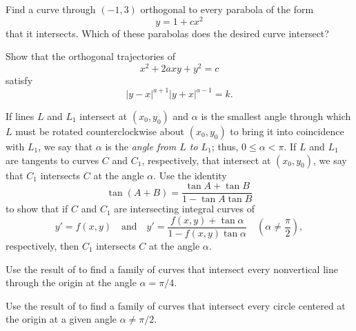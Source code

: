 \begin{exerciselist}
\item\label{exer:4.5.30}Find a curve through $(-1,3)$ orthogonal to every parabola of the form
\[
y=1+cx^2
\]
that it intersects. Which of these parabolas does the desired curve
intersect?

\item\label{exer:4.5.31}Show that the orthogonal trajectories of
\[
x^2+2axy+y^2=c
\]
satisfy
\[
|y-x|^{a+1}|y+x|^{a-1}=k.
\]

\item\label{exer:4.5.32}If lines $L$ and $L_1$ intersect at $(x_0,y_0)$ and $\alpha$ is the
smallest angle through which $L$ must be rotated counterclockwise
about $(x_0,y_0)$ to bring it into coincidence with $L_1$, we say that
$\alpha$ is the \emph{\color{blue}angle from $L$ to $L_1$};   thus,
$0\le\alpha<\pi$. If $L$ and $L_1$ are tangents to curves $C$ and
$C_1$, respectively, that intersect at $(x_0,y_0)$, we say that $C_1$
intersects $C$ at the angle $\alpha$. Use the identity
\[
\tan(A+B)=\frac{\tan A+\tan B}{1-\tan A\tan B}
\]
to show that if $C$ and $C_1$ are intersecting integral curves of
\[
y'=f(x,y)  \quad\text{and}\quad y'=\frac{f(x,y)+\tan\alpha}{1-f(x,y)\tan\alpha} \quad\left( \alpha \ne \frac{\pi}{2}\right),
\]
respectively, then $C_1$ intersects $C$ at the angle $\alpha$.

\item\label{exer:4.5.33}Use the result of  to find a family of curves
that intersect every nonvertical line through the origin at the angle
$\alpha=\pi/4$.

\item\label{exer:4.5.34}Use the result of  to find a family of curves
that intersect every circle centered at the origin at a given angle
$\alpha \ne \pi/2$.

\end{exerciselist}
